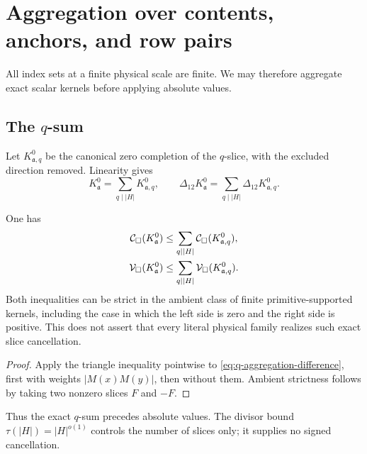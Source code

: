 \section{Aggregation over contents, anchors, and row pairs}
\label{sec:q-aggregation}

All index sets at a finite physical scale are finite.  We may therefore
aggregate exact scalar kernels before applying absolute values.

\subsection{The \texorpdfstring{\(q\)}{q}-sum}

Let \(K_{\mathfrak a,q}^{0}\) be the canonical zero completion of the
\(q\)-slice, with the excluded direction removed.  Linearity gives
\begin{equation}
 K_{\mathfrak a}^{0}
 =
 \sum_{q\mid|H|}K_{\mathfrak a,q}^{0},
 \qquad
 \Delta_{12}K_{\mathfrak a}^{0}
 =
 \sum_{q\mid|H|}
 \Delta_{12}K_{\mathfrak a,q}^{0}.
 \label{eq:q-aggregation-difference}
\end{equation}

\begin{proposition}
\label{prop:q-aggregation-sharpness}
One has
\begin{align}
 \mathcal C_\square(K_{\mathfrak a}^{0})
 &\le
 \sum_{q\mid|H|}\mathcal C_\square(K_{\mathfrak a,q}^{0}),
 \label{eq:q-weighted-subadditivity}\\
 \mathcal V_\square(K_{\mathfrak a}^{0})
 &\le
 \sum_{q\mid|H|}\mathcal V_\square(K_{\mathfrak a,q}^{0}).
 \label{eq:q-variation-subadditivity}
\end{align}
Both inequalities can be strict in the ambient class of finite
primitive-supported kernels, including the case in which the left side is
zero and the right side is positive.  This does not assert that every
literal physical family realizes such exact slice cancellation.
\end{proposition}

\begin{proof}
Apply the triangle inequality pointwise to
\eqref{eq:q-aggregation-difference}, first with weights
\(|M(x)M(y)|\), then without them.  Ambient strictness follows by taking
two nonzero slices \(F\) and \(-F\).
\end{proof}

Thus the exact \(q\)-sum precedes absolute values.  The divisor bound
\(\tau(|H|)=|H|^{o(1)}\) controls the number of slices only; it supplies no
signed cancellation.

